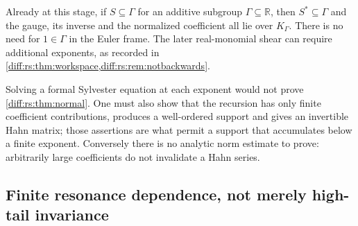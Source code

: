 \documentclass[11pt,letterpaper]{article}
\numberwithin{equation}{section}
\theoremstyle{definition}
\theoremstyle{remark}
\newcommand{\R}{\mathbb R}
\begin{document}
Already at this stage, if $S\subseteq\Gamma$ for an additive subgroup
$\Gamma\subseteq\R$, then $S^{*}\subseteq\Gamma$ and the gauge, its
inverse and the normalized coefficient all lie over $K_{\Gamma}$.
There is no need for $1\in\Gamma$ in the Euler frame. The later
real-monomial shear can require additional exponents, as recorded in
\cref{diff:rs:thm:workspace,diff:rs:rem:notbackwards}.

\begin{remark}
\label{diff:rs:rem:difficulty}
Solving a formal Sylvester equation at each exponent would not prove
\cref{diff:rs:thm:normal}. One must also show that the recursion has only
finite coefficient contributions, produces a well-ordered support and gives an
invertible Hahn matrix; those assertions are what permit a support that
accumulates below a finite exponent. Conversely there is no analytic norm
estimate to prove: arbitrarily large coefficients do not invalidate a Hahn
series.
\end{remark}

\subsection{Finite resonance dependence, not merely high-tail invariance}
\label{diff:rs:sub:finite}
\end{document}
